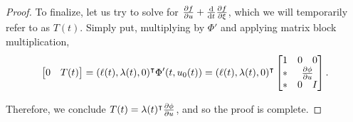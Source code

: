 \documentclass{article}
\theoremstyle{plain}
\theoremstyle{plain}
\theoremstyle{nonumberplain}
\newtheorem{proof}{Proof}
\theoremstyle{empty}
\newcommand{\tr}{\intercal}
\begin{document}
\begin{proof}
To finalize, let us try to solve for $\diffp f u + \diff*{\diffp f {\xi}}t$, which we will temporarily refer to as $T(t)$. Simply put, multiplying by $\Phi'$ and applying matrix block multiplication,
\[\begin{bmatrix}0 & T(t)\end{bmatrix} = (\ell(t), \lambda(t), 0)^\tr \Phi'(t,u_0(t)) =
(\ell(t), \lambda(t), 0)^\tr
\begin{bmatrix}
1 & \begin{matrix} 0 & 0 \end{matrix}\\
* & \diffp\phi u\\
* & \begin{matrix}
0 & I
\end{matrix}
\end{bmatrix}.\]

Therefore, we conclude $T(t) = \lambda(t)^\tr \diffp\phi u$, and so the proof is complete.
\end{proof}
\end{document}

